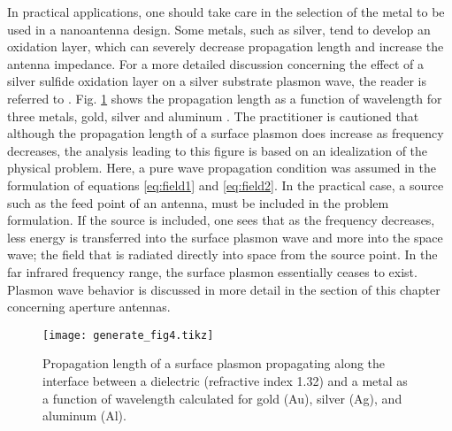 In practical applications, one should take care in the selection of the metal to be used in a nanoantenna design. Some metals, such as silver, tend to develop an oxidation layer, which can severely decrease propagation length and increase the antenna impedance. For a more detailed discussion concerning the effect of a silver sulfide oxidation layer on a silver substrate plasmon wave, the reader is referred to \cite{Nevels2014}.
%
Fig. \ref{fig:plength} shows the propagation length as a function of wavelength for three metals, gold, silver and aluminum \cite{9783540339199}. The practitioner is cautioned that although the propagation length of a surface plasmon does increase as frequency decreases, the analysis leading to this figure is based on an idealization of the physical problem. Here, a pure wave propagation condition was assumed in the formulation of equations \eqref{eq:field1} and \eqref{eq:field2}. In the practical case, a source such as the feed point of an antenna, must be included in the problem formulation. If the source is included, one sees that as the frequency decreases, less energy is transferred into the surface plasmon wave and more into the space wave; the field that is radiated directly into space from the source point. In the far infrared frequency range, the surface plasmon essentially ceases to exist. Plasmon wave behavior is discussed in more detail in the section of this chapter concerning aperture antennas.
%
\begin{figure}[t!]
  \centering
  {\texttt{[image: generate\_fig4.tikz]}}
  \caption{Propagation length of a surface plasmon propagating along the interface between a dielectric (refractive index 1.32) and a metal as a function of wavelength calculated for gold (Au), silver (Ag), and aluminum (Al).}
  \label{fig:plength}
\end{figure}
%
